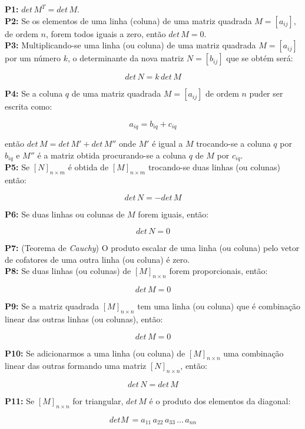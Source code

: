 \textbf{P1:} $ det \, M^T = det \, M $.\\

\textbf{P2:} Se os elementos de uma linha (coluna) de uma matriz quadrada $ M = [a_{ij}] $, de ordem $n$, forem todos iguais a zero, então $ det \, M = 0 $.\\

\textbf{P3:} Multiplicando-se uma linha (ou coluna) de uma matriz quadrada $ M = [a_{ij}] $ por um número $k$, o determinante da nova matriz $ N = [b_{ij}] $ que se obtém será:

\[
det \, N = k \, det \, M
\]

\textbf{P4:} Se a coluna $q$ de uma matriz quadrada $ M = [a_{ij}] $ de ordem $n$ puder ser escrita como:

\[ a_{iq} = b_{iq} + c_{iq} \]

então $ det \, M = det \, M' + det \, M''$ onde $M'$ é igual a $M$ trocando-se a coluna $q$ por $b_{iq}$ e $M''$ é a matriz obtida procurando-se a coluna $q$ de $M$ por $c_{iq}$.\\

\textbf{P5:} Se $[N]_{n \times m}$ é obtida de $[M]_{n \times m}$ trocando-se duas linhas (ou colunas) então:

\[
 det \,N = -det \, M
\]

\textbf{P6:} Se duas linhas ou colunas de $M$ forem iguais, então:

\[
 det \, N = 0
\]

\textbf{P7:} (Teorema de \textit{Cauchy}) O produto escalar de uma linha (ou coluna) pelo vetor de cofatores de uma outra linha (ou coluna) é zero.\\

\textbf{P8:} Se duas linhas (ou colunas) de $[M]_{n \times n}$ forem proporcionais, então:

\[
 det \, M = 0
\]

\textbf{P9:} Se a matriz quadrada $[M]_{n \times n}$ tem uma linha (ou coluna) que é combinação linear das outras linhas (ou colunas), então:

\[
 det \, M = 0
\]

\textbf{P10:} Se adicionarmos a uma linha (ou coluna) de $[M]_{n \times n}$ uma combinação linear das outras formando uma matriz $[N]_{n \times n}$, então:

\[
 det \, N = det \, M
\]

\textbf{P11:} Se $[M]_{n \times n}$ for triangular, $det \, M$ é o produto dos elementos da diagonal:

\[
 det M \, = a_{11} \, a_{22} \, a_{33} \, \ldots \, a_{nn}
\]


